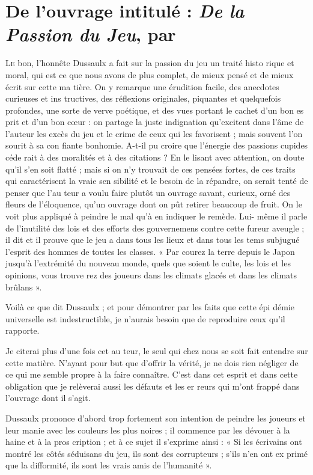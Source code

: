 \chapter{
  De l'ouvrage intitulé : \emph{De la Passion
  du Jeu}, par %
}

\lettrine{L}{e} bon, l'honnête Dussaulx a fait
sur la passion du jeu un traité histo%
rique et moral, qui est ce que nous
avons de plus complet, de mieux
pensé et de mieux écrit sur cette ma%
tière. On y remarque une érudition
facile, des anecdotes curieuses et ins%
tructives, des réflexions originales,
piquantes et quelquefois profondes,
une sorte de verve poétique, et des
vues portant le cachet d'un bon es%
prit et d'un bon cœur : on partage
la juste indignation qu'excitent dans
l'âme de l'auteur les excès du jeu et
le crime de ceux qui les favorisent ;
mais souvent l'on sourit à sa con%
fiante bonhomie. A-t-il pu croire que
l'énergie des passions cupides céde%
rait à des moralités et à des citations ?
En le lisant avec attention, on doute
qu'il s'en soit flatté ; mais si on n'y
trouvait de ces pensées fortes, de ces
traits qui caractérisent la vraie sen%
sibilité et le besoin de la répandre,
on serait tenté de penser que l'au%
teur a voulu faire plutôt un ouvrage
savant, curieux, orné des fleurs de
l'éloquence, qu'un ouvrage dont on
pût retirer beaucoup de fruit. On le
voit plus appliqué à peindre le mal
qu'à en indiquer le remède. Lui-%
même il parle de l'inutilité des lois et
des efforts des gouvernemens contre
cette fureur aveugle ; il dit et il prouve
que le jeu a dans tous les lieux et dans
tous les tems subjugué l'esprit des
hommes de toutes les classes. « Par%
courez la terre depuis le Japon
jusqu'à l'extrémité du nouveau
monde, quels que soient le culte,
les lois et les opinions, vous trouve%
rez des joueurs dans les climats
glacés et dans les climats brûlans ».

Voilà ce que dit Dussaulx ; et pour
démontrer par les faits que cette épi%
démie universelle est indestructible,
je n'aurais besoin que de reproduire
ceux qu'il rapporte.

Je citerai plus d'une fois cet au%
teur, le seul qui chez nous se soit fait
entendre sur cette matière. N'ayant
pour but que d'offrir la vérité, je ne
dois rien négliger de ce qui me semble
propre à la faire connaître. C'est dans
cet esprit et dans cette obligation que
je relèverai aussi les défauts et les er%
reurs qui m'ont frappé dans l'ouvrage
dont il s'agit.

Dussaulx prononce d'abord trop
fortement son intention de peindre
les joueurs et leur manie avec les
couleurs les plus noires ; il commence
par les dévouer à la haine et à la pros%
cription ; et à ce sujet il s'exprime
ainsi : « Si les écrivains ont montré
les côtés séduisans du jeu, ils sont
des corrupteurs ; s'ils n'en ont ex%
primé que la difformité, ils sont
les vrais amis de l'humanité ».

